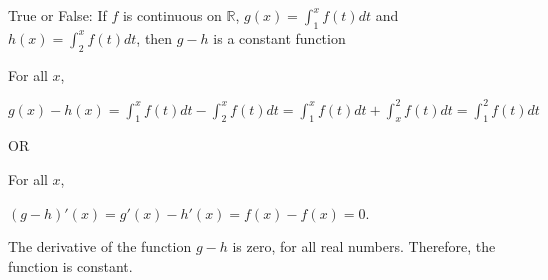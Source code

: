 \documentclass{ximera}
\author{Steven Gubkin}
\begin{document}
\begin{exercise}

True or False:  If  $f$ is continuous on $\mathbb{R}$,  $g(x)= \int_1^{x} f(t) dt$ and  $h(x)= \int_2^x f(t) dt$, then $g-h$ is a constant function

\begin{hint}
For all $x$,


 $g(x)-h(x)=\int_1^{x} f(t) dt- \int_2^x f(t) dt=\int_1^{x} f(t) dt+ \int_x^2 f(t) dt=\int_1^{2} f(t) dt$
 
 OR
 
 
 For all $x$,
 
 
 $(g-h)'(x)=g'(x)-h'(x)=f(x)-f(x)=0$.
 
 
 The derivative of the function $g-h$ is zero, for all real numbers. Therefore, the function is constant.
\end{hint}
\begin{prompt}
	\begin{multipleChoice}
	\end{multipleChoice}
\end{prompt}

\end{exercise}
\end{document}
